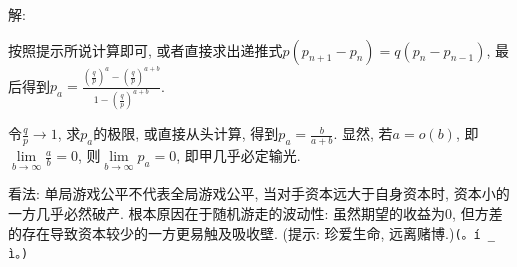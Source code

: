 \documentclass[standard]{ExBook}
\begin{document}
\begin{qitems}
\vspace{-5em}

    \begin{bbox}
解: 

按照提示所说计算即可, 或者直接求出递推式$p(p_{n+1}-p_{n})=q(p_{n}-p_{n-1})$, 最后得到$p_{a}=\displaystyle\frac{\left(\frac{q}{p}\right)^{a}-\left(\frac{q}{p}\right)^{a+b}}{1-\left(\frac{q}{p}\right)^{a+b}}$. 

令$\frac{q}{p}\to1$, 求$p_a$的极限, 或直接从头计算, 得到$p_a=\frac{b}{a+b}$. 显然, 若$a=o(b)$, 即$\lim\limits_{b\to\infty}\frac{a}{b}=0$, 则$\lim\limits_{b\to\infty}p_{a}=0$, 即甲几乎必定输光.
    \end{bbox}

\vspace{-5em}

    \begin{bbox}
看法: 单局游戏公平不代表全局游戏公平, 当对手资本远大于自身资本时, 资本小的一方几乎必然破产. 根本原因在于随机游走的波动性: 虽然期望的收益为0, 但方差的存在导致资本较少的一方更易触及吸收壁. (提示: 珍爱生命, 远离赌博.)\texttt{(。í \_ ì。)}
    \end{bbox}

\end{qitems}


\section{}
\end{document}
